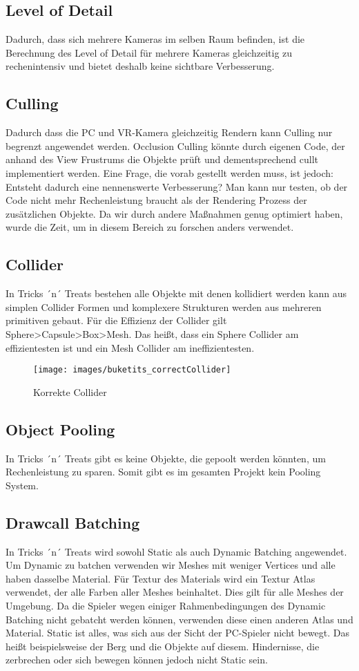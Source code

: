 \subsection{Level of Detail}
Dadurch, dass sich mehrere Kameras im selben Raum befinden, ist die Berechnung des Level of Detail für mehrere Kameras gleichzeitig zu rechenintensiv und bietet deshalb keine sichtbare Verbesserung.

\subsection{Culling}
Dadurch dass die PC und VR-Kamera gleichzeitig Rendern kann Culling nur begrenzt angewendet werden. Occlusion Culling könnte durch eigenen Code, der anhand des View Frustrums die Objekte prüft und dementsprechend cullt implementiert werden. Eine Frage, die vorab gestellt werden muss, ist jedoch: Entsteht dadurch eine nennenswerte Verbesserung? Man kann nur testen, ob der Code nicht mehr Rechenleistung braucht als der Rendering Prozess der zusätzlichen Objekte. Da wir durch andere Maßnahmen genug optimiert haben, wurde die Zeit, um in diesem Bereich zu forschen anders verwendet.

\subsection{Collider}
 In Tricks ´n´ Treats bestehen alle Objekte mit denen kollidiert werden kann aus simplen Collider Formen und komplexere Strukturen werden aus mehreren primitiven gebaut. 
 Für die Effizienz der Collider gilt Sphere>Capsule>Box>Mesh. Das heißt, dass ein Sphere Collider am effizientesten ist und ein Mesh Collider am ineffizientesten.
\begin{figure}[H]
	\centering
	\texttt{[image: images/buketits\_correctCollider]}
	\caption{Korrekte Collider}
\end{figure}

\subsection{Object Pooling}
In Tricks ´n´ Treats gibt es keine Objekte, die gepoolt werden könnten, um Rechenleistung zu sparen. Somit gibt es im gesamten Projekt kein Pooling System.

\subsection{Drawcall Batching}
In Tricks ´n´ Treats wird sowohl Static als auch Dynamic Batching angewendet. Um Dynamic zu batchen verwenden wir Meshes mit weniger Vertices und alle haben dasselbe Material. Für Textur des Materials wird ein Textur Atlas verwendet, der alle Farben aller Meshes beinhaltet. Dies gilt für alle Meshes der Umgebung. Da die Spieler wegen einiger Rahmenbedingungen des Dynamic Batching nicht gebatcht werden können, verwenden diese einen anderen Atlas und Material. Static ist alles, was sich aus der Sicht der PC-Spieler nicht bewegt. Das heißt beispielsweise der Berg und die Objekte auf diesem. Hindernisse, die zerbrechen oder sich bewegen können jedoch nicht Static sein.

